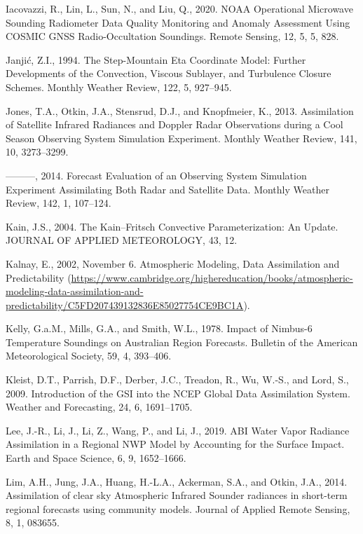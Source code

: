 \documentclass[12pt,oneside]{reedthesis}
\begin{document}
\leavevmode\hypertarget{ref-iacovazzi2020}{}%
Iacovazzi, R., Lin, L., Sun, N., and Liu, Q., 2020. NOAA Operational Microwave Sounding Radiometer Data Quality Monitoring and Anomaly Assessment Using COSMIC GNSS Radio-Occultation Soundings. Remote Sensing, 12, 5, 5, 828.

\leavevmode\hypertarget{ref-janjic1994}{}%
Janjić, Z.I., 1994. The Step-Mountain Eta Coordinate Model: Further Developments of the Convection, Viscous Sublayer, and Turbulence Closure Schemes. Monthly Weather Review, 122, 5, 927--945.

\leavevmode\hypertarget{ref-jones2013}{}%
Jones, T.A., Otkin, J.A., Stensrud, D.J., and Knopfmeier, K., 2013. Assimilation of Satellite Infrared Radiances and Doppler Radar Observations during a Cool Season Observing System Simulation Experiment. Monthly Weather Review, 141, 10, 3273--3299.

\leavevmode\hypertarget{ref-jones2014}{}%
---------, 2014. Forecast Evaluation of an Observing System Simulation Experiment Assimilating Both Radar and Satellite Data. Monthly Weather Review, 142, 1, 107--124.

\leavevmode\hypertarget{ref-kain2004}{}%
Kain, J.S., 2004. The Kain--Fritsch Convective Parameterization: An Update. JOURNAL OF APPLIED METEOROLOGY, 43, 12.

\leavevmode\hypertarget{ref-kalnay2002}{}%
Kalnay, E., 2002, November 6. Atmospheric Modeling, Data Assimilation and Predictability (\url{https://www.cambridge.org/highereducation/books/atmospheric-modeling-data-assimilation-and-predictability/C5FD207439132836E85027754CE9BC1A}).

\leavevmode\hypertarget{ref-kelly1978}{}%
Kelly, G.a.M., Mills, G.A., and Smith, W.L., 1978. Impact of Nimbus-6 Temperature Soundings on Australian Region Forecasts. Bulletin of the American Meteorological Society, 59, 4, 393--406.

\leavevmode\hypertarget{ref-kleist2009}{}%
Kleist, D.T., Parrish, D.F., Derber, J.C., Treadon, R., Wu, W.-S., and Lord, S., 2009. Introduction of the GSI into the NCEP Global Data Assimilation System. Weather and Forecasting, 24, 6, 1691--1705.

\leavevmode\hypertarget{ref-lee2019}{}%
Lee, J.-R., Li, J., Li, Z., Wang, P., and Li, J., 2019. ABI Water Vapor Radiance Assimilation in a Regional NWP Model by Accounting for the Surface Impact. Earth and Space Science, 6, 9, 1652--1666.

\leavevmode\hypertarget{ref-lim2014}{}%
Lim, A.H., Jung, J.A., Huang, H.-L.A., Ackerman, S.A., and Otkin, J.A., 2014. Assimilation of clear sky Atmospheric Infrared Sounder radiances in short-term regional forecasts using community models. Journal of Applied Remote Sensing, 8, 1, 083655.
\end{document}
